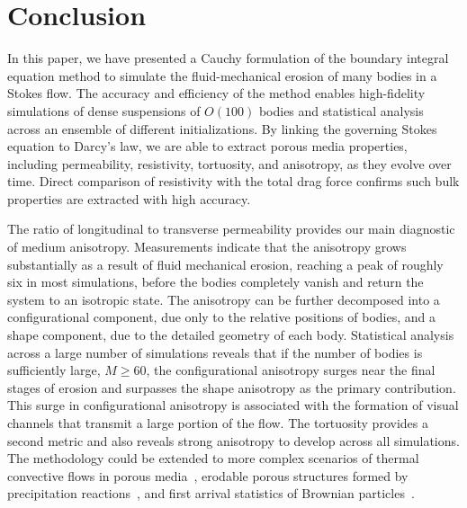\documentclass[3p]{elsarticle}
\begin{document}
\section{Conclusion}
\label{sec:conclusion}

In this paper, we have presented a Cauchy formulation of the boundary integral equation method to simulate the fluid-mechanical erosion of many bodies in a Stokes flow. The accuracy and efficiency of the method enables high-fidelity simulations of dense suspensions of $O(100)$ bodies and statistical analysis across an ensemble of different initializations. By linking the governing Stokes equation to Darcy's law, we are able to extract porous media properties, including permeability, resistivity, tortuosity, and anisotropy, as they evolve over time. Direct comparison of resistivity with the total drag force confirms such bulk properties are extracted with high accuracy.

The ratio of longitudinal to transverse permeability provides our main
diagnostic of medium anisotropy. Measurements indicate that the
anisotropy grows substantially as a result of fluid mechanical erosion,
reaching a peak of roughly six in most simulations, before the bodies
completely vanish and return the system to an isotropic state. The
anisotropy can be further decomposed into a configurational component,
due only to the relative positions of bodies, and a shape component, due
to the detailed geometry of each body. Statistical analysis across a
large number of simulations reveals that if the number of bodies is
sufficiently large, $M \ge 60$, the configurational anisotropy surges
near the final stages of erosion and surpasses the shape anisotropy as
the primary contribution. This surge in configurational anisotropy is
associated with the formation of visual channels that transmit a large
portion of the flow. The tortuosity provides a second metric and also
reveals strong anisotropy to develop across all simulations. The
methodology could be extended to more complex scenarios of thermal
convective flows in porous media~\cite{McCurdy2019}, erodable porous
structures formed by precipitation
reactions~\cite{eastham2020multiphase}, and first arrival statistics of
Brownian particles~\cite{che-lin-her-qua2021}. 



\end{document}
